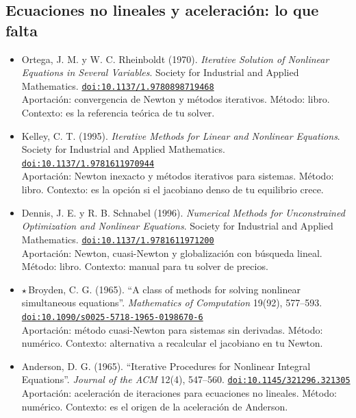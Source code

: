 \documentclass[11pt]{article}
\begin{document}
\subsection*{Ecuaciones no lineales y aceleración: lo que falta}
\begin{itemize}
\item Ortega, J. M. y W. C. Rheinboldt (1970). \textit{Iterative Solution of Nonlinear Equations in Several Variables}. Society for Industrial and Applied Mathematics. \href{https://doi.org/10.1137/1.9780898719468}{\texttt{doi:10.1137/1.9780898719468}}\\
Aportación: convergencia de Newton y métodos iterativos. Método: libro. Contexto: es la referencia teórica de tu solver.
\item Kelley, C. T. (1995). \textit{Iterative Methods for Linear and Nonlinear Equations}. Society for Industrial and Applied Mathematics. \href{https://doi.org/10.1137/1.9781611970944}{\texttt{doi:10.1137/1.9781611970944}}\\
Aportación: Newton inexacto y métodos iterativos para sistemas. Método: libro. Contexto: es la opción si el jacobiano denso de tu equilibrio crece.
\item Dennis, J. E. y R. B. Schnabel (1996). \textit{Numerical Methods for Unconstrained Optimization and Nonlinear Equations}. Society for Industrial and Applied Mathematics. \href{https://doi.org/10.1137/1.9781611971200}{\texttt{doi:10.1137/1.9781611971200}}\\
Aportación: Newton, cuasi-Newton y globalización con búsqueda lineal. Método: libro. Contexto: manual para tu solver de precios.
\item $\star$\,Broyden, C. G. (1965). ``A class of methods for solving nonlinear simultaneous equations''. \textit{Mathematics of Computation} 19(92), 577--593. \href{https://doi.org/10.1090/s0025-5718-1965-0198670-6}{\texttt{doi:10.1090/s0025-5718-1965-0198670-6}}\\
Aportación: método cuasi-Newton para sistemas sin derivadas. Método: numérico. Contexto: alternativa a recalcular el jacobiano en tu Newton.
\item Anderson, D. G. (1965). ``Iterative Procedures for Nonlinear Integral Equations''. \textit{Journal of the ACM} 12(4), 547--560. \href{https://doi.org/10.1145/321296.321305}{\texttt{doi:10.1145/321296.321305}}\\
Aportación: aceleración de iteraciones para ecuaciones no lineales. Método: numérico. Contexto: es el origen de la aceleración de Anderson.

\end{itemize}
\end{document}
